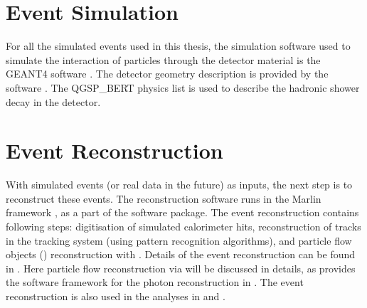 
\section{Event Simulation}

For all the simulated events used in this thesis, the simulation software used to simulate the interaction of particles through the detector material is the GEANT4 software \cite{Agostinelli:2002hh}. The detector geometry description is provided by the \Mokka software \cite{MoradeFreitas:2002kj}.  The QGSP\_BERT physics list is used to describe the hadronic shower decay in the detector.


\section{Event Reconstruction}

With simulated events (or real data in the future) as inputs, the next step is to reconstruct these events. The reconstruction software runs in the Marlin framework \cite{Gaede:2006pj}, as a part of the \ilcsoft software package. The event reconstruction contains following steps: digitisation of simulated calorimeter hits, reconstruction of tracks in the tracking system (using pattern recognition algorithms), and particle flow objects (\PFOs) reconstruction with \pandora\cite{Thomson:2009rp,Marshall:2012ry}. Details of the event reconstruction can be found in \cite{Brau:2007zza,Linssen:2012hp}. Here particle flow reconstruction via \pandora will be discussed in details, as \pandora provides the software framework for the photon reconstruction in . The \pandora event reconstruction is also used in the analyses in   and .

